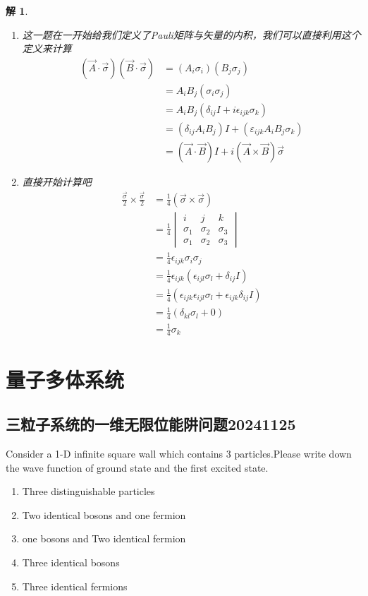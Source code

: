 \documentclass{article}
\newtheorem{solution}{解}
\newcommand{\vmthree}[9]{
    \begin{vmatrix}
        #1&#2&#3\\
        #4&#5&#6\\
        #7&#8&#9
    \end{vmatrix}
}
\begin{document}
\begin{solution}
\begin{enumerate}
        于是，我们得到了最终需要证明的表达式
        \begin{align*}
            \sigma_i\sigma_j&=i\epsilon_{ijk}\sigma_k+\delta_{ij}I
        \end{align*}
        \item[(4)] 
        这一题在一开始给我们定义了Pauli矩阵与矢量的内积，我们可以直接利用这个定义来计算
        \begin{align*}
            (\vec{A}\cdot\vec{\sigma})(\vec{B}\cdot\vec{\sigma})&=(A_i\sigma_i)(B_j\sigma_j)\\
            &=A_iB_j(\sigma_i\sigma_j)\\
            &=A_iB_j(\delta_{ij}I+i\epsilon_{ijk}\sigma_k)\\
            &=(\delta_{ij}A_iB_j)I+(\varepsilon_{ijk}A_iB_j\sigma_k)\\
            &=(\vec{A}\cdot\vec{B})I+i(\vec{A}\times\vec{B})\vec{\sigma}
        \end{align*}
        \item[(5)] 直接开始计算吧
        \begin{align*}
            \frac{\vec{\sigma}}{2}\times\frac{\vec{\sigma}}{2}&=\frac{1}{4}(\vec{\sigma}\times\vec{\sigma})\\
            &=\frac{1}{4}\vmthree{i}{j}{k}{\sigma_1}{\sigma_2}{\sigma_3}{\sigma_1}{\sigma_2}{\sigma_3}\\
            &=\frac{1}{4}\epsilon_{ijk}\sigma_i\sigma_j\\
            &=\frac{1}{4}\epsilon_{ijk}\left(\epsilon_{ijl}\sigma_l+\delta_{ij}I\right)\\
            &=\frac{1}{4}\left(\epsilon_{ijk}\epsilon_{ijl}\sigma_l+\epsilon_{ijk}\delta_{ij}I\right)\\
            &=\frac{1}{4}\left(\delta_{kl}\sigma_l+0\right)\\
            &=\frac{1}{4}\sigma_k
        \end{align*}
    \end{enumerate}
\end{solution}
\newpage
\section{量子多体系统}
\subsection{三粒子系统的一维无限位能阱问题20241125}
Consider a 1-D infinite square wall which contains 3 particles.Please write down the wave function of ground state and the first excited state.
\begin{enumerate}
    \item Three distinguishable particles
    \item Two identical bosons and one fermion
    \item one bosons and Two identical fermion
    \item Three identical bosons
    \item Three identical fermions
\end{enumerate}
\end{document}
